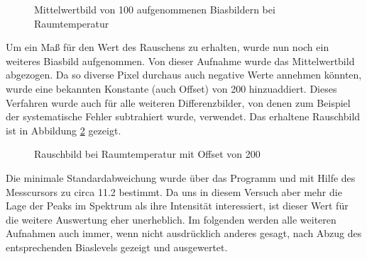 		\begin{figure}
			\center
			\caption{Mittelwertbild von 100 aufgenommenen Biasbildern bei Raumtemperatur}
			\label{fig:bias-mean}
		\end{figure}

		Um ein Maß für den Wert des Rauschens zu erhalten, wurde nun noch ein weiteres Biasbild aufgenommen.
		Von dieser Aufnahme wurde das Mittelwertbild abgezogen.
		Da so diverse Pixel durchaus auch negative Werte annehmen könnten, wurde eine bekannten Konstante (auch Offset) von 200 hinzuaddiert. 
		Dieses Verfahren wurde auch für alle weiteren Differenzbilder, von denen zum Beispiel der systematische Fehler subtrahiert wurde, verwendet.
		Das erhaltene Rauschbild ist in Abbildung \ref{fig:bias-noise} gezeigt.

		\begin{figure}
			\center
			\caption{Rauschbild bei Raumtemperatur mit Offset von 200}
			\label{fig:bias-noise}
		\end{figure}

		Die minimale Standardabweichung wurde über das Programm und mit Hilfe des Messcursors zu circa 11.2 bestimmt.
		Da uns in diesem Versuch aber mehr die Lage der Peaks im Spektrum als ihre Intensität interessiert, ist dieser Wert für die weitere Auswertung eher unerheblich.
		Im folgenden werden alle weiteren Aufnahmen auch immer, wenn nicht ausdrücklich anderes gesagt, nach Abzug des entsprechenden Biaslevels gezeigt und ausgewertet.

